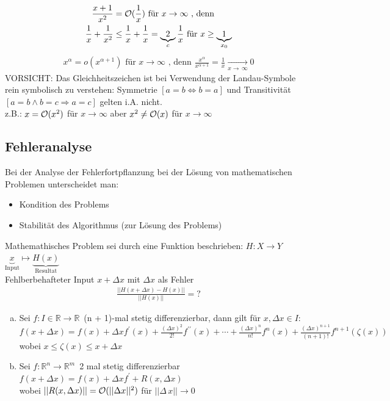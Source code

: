 \begin{align*}
  \frac{x + 1}{x^2} &= \mathcal{O}(\frac{1}{x}) \text{ für } x \to \infty \text{ , denn } \\
  \frac{1}{x} + \frac{1}{x^2} &\leq \frac{1}{x} + \frac{1}{x} = \underbrace{2}_c \frac{1}{x} \text{ für } x \geq \underbrace{1}_{x_0}
\end{align*}
\begin{align*}
  x^{\alpha} = o(x^{\alpha + 1}) \text{ für } x \to \infty \text{ , denn }
  \frac{x^{\alpha}}{x^{\alpha + 1}} = \frac{1}{x} \xrightarrow[x\to\,\infty]{}0
\end{align*}
\textcolor{rot}{VORSICHT}: Das Gleichheitszeichen ist bei Verwendung der Landau-Symbole rein symbolisch
zu verstehen: Symmetrie $[a = b \Leftrightarrow b = a]$ und Transitivität 
$[a = b \wedge b = c \Rightarrow a = c]$ gelten i.A. nicht. \\
z.B.: $x = \mathcal{O}(x^2)$ für $x \to \infty$ aber $x^2 \neq \mathcal{O}(x)$ für $x \to \infty$

\subsection{Fehleranalyse}
Bei der Analyse der Fehlerfortpflanzung bei der Lösung von mathematischen Problemen
unterscheidet man:
\begin{itemize}
  \item Kondition des Problems
  \item Stabilität des Algorithmus (zur Lösung des Problems)
\end{itemize}
Mathemathisches Problem sei durch eine Funktion beschrieben: $H:X \to Y$ \\ 
$\underbrace{x}_{\textrm{Input}} \mapsto \underbrace{H(x)}_{\textrm{Resultat}}$\\
Fehlberbehafteter Input $x + \Delta x$ mit $\Delta x$ als Fehler
\begin{align*}
  \frac{|| H(x + \Delta x) - H(x)||}{|| H(x) ||} = ?
\end{align*}
\begin{enumerate}[(a)]
  \item Sei $f: I \in \mathbb{R} \to \mathbb{R}\,$ (n + 1)-mal stetig differenzierbar, dann gilt für
    $x, \Delta x \in I$: \\
    $f(x + \Delta x) = f(x) + \Delta x f^{\prime}(x) + 
    \frac{(\Delta x)^2}{2!}f^{\prime\prime}(x) + \cdots + 
    \frac{(\Delta x)^n}{n!}f^n(x)+
    \frac{(\Delta x)^{n + 1}}{(n + 1)!}f^{n + 1}(\zeta(x)) $ \\
    wobei $x \leq \zeta(x)\leq x + \Delta x$
  \item Sei $f: \mathbb{R}^n \to \mathbb{R}^m\,$ 2 mal stetig differenzierbar \\
    $f(x + \Delta x) = f(x) + \Delta x f^{\prime} + R(x, \Delta x) $ \\
    wobei $||R(x, \Delta x)|| = \mathcal{O}(||\Delta x||^2)$ für $||\Delta\,x|| \to 0$
\end{enumerate}


